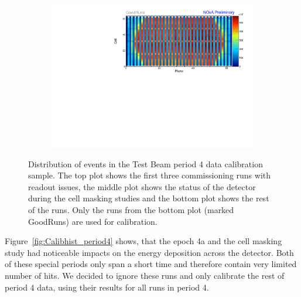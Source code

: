 \begin{figure}[!hbtp]
\begin{subfigure}[b]{\textwidth}
\end{subfigure}
\begin{subfigure}[b]{\textwidth}
\centering
\includegraphics[width=\textwidth]{Plots/TBCalibration/Attenprofs_P4Data_CellPlane_GoodRuns.pdf}
\end{subfigure}
\caption[Plane-Cell distribution of hits for the period 4 data sample]{Distribution of events in the Test Beam period 4 data calibration sample. The top plot shows the first three commissioning runs with readout issues, the middle plot shows the status of the detector during the cell masking studies and the bottom plot shows the rest of the runs. Only the runs from the bottom plot (marked GoodRuns) are used for calibration.}
\label{fig:CalibhistMap_period4}
\end{figure}

Figure~\ref{fig:Calibhist_period4} shows, that the epoch 4a and the cell masking study had noticeable impacts on the energy deposition across the detector. Both of these special periods only span a short time and therefore contain very limited number of hits. We decided to ignore these runs and only calibrate the rest of period 4 data, using their results for all runs in period 4.


